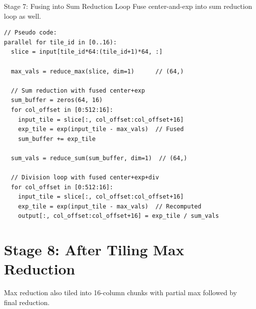 \documentclass[aspectratio=169]{beamer}
\begin{document}
\begin{frame}[fragile]{Stage 7: Fusing into Sum Reduction Loop}
Fuse center-and-exp into sum reduction loop as well.

\begin{lstlisting}
// Pseudo code:
parallel for tile_id in [0..16):
  slice = input[tile_id*64:(tile_id+1)*64, :]

  max_vals = reduce_max(slice, dim=1)      // (64,)

  // Sum reduction with fused center+exp
  sum_buffer = zeros(64, 16)
  for col_offset in [0:512:16]:
    input_tile = slice[:, col_offset:col_offset+16]
    exp_tile = exp(input_tile - max_vals)  // Fused
    sum_buffer += exp_tile

  sum_vals = reduce_sum(sum_buffer, dim=1)  // (64,)

  // Division loop with fused center+exp+div
  for col_offset in [0:512:16]:
    input_tile = slice[:, col_offset:col_offset+16]
    exp_tile = exp(input_tile - max_vals)  // Recomputed
    output[:, col_offset:col_offset+16] = exp_tile / sum_vals
\end{lstlisting}
\end{frame}

\section{Stage 8: After Tiling Max Reduction}

Max reduction also tiled into 16-column chunks with partial max followed by final reduction.
\end{document}
